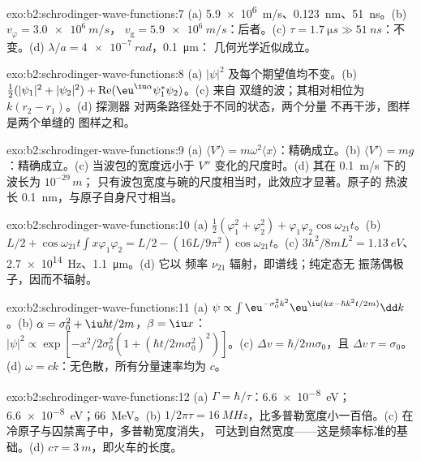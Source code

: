 \begin{solution}{exo:b2:schrodinger-wave-functions:7}
(a) \qty{5.9e6}{m/s}、\qty{0.123}{nm}、\qty{51}{ns}。(b) $v_\varphi = \qty{3.0e6}{m/s}$，
$v_{\text{g}} = \qty{5.9e6}{m/s}$：后者。(c) $\tau = \qty{1.7}{\micro s} \gg
\qty{51}{ns}$：不变。(d) $\lambda/a = \qty{4e-7}{rad}$，\qty{0.1}{\micro m}：
几何光学近似成立。
\end{solution}

\begin{solution}{exo:b2:schrodinger-wave-functions:8}
(a) $|\psi|^2$ 及每个期望值均不变。(b) $\tfrac12(|\psi_1|^2
+ |\psi_2|^2) + \operatorname{Re}(\eu^{\iu\alpha}\psi_1^*\psi_2)$。(c) 来自
双缝的波；其相对相位为 $k(r_2 - r_1)$。(d) 探测器
对两条路径处于不同的状态，两个分量
不再干涉，图样是两个单缝的
图样之和。
\end{solution}

\begin{solution}{exo:b2:schrodinger-wave-functions:9}
(a) $\langle V'\rangle = m\omega^2\langle x\rangle$：精确成立。(b) $\langle V'\rangle
= mg$：精确成立。(c) 当波包的宽度远小于
$V''$ 变化的尺度时。(d) 其在 \qty{0.1}{m/s} 下的波长为 $10^{-29}\,\unit{m}$；
只有波包宽度与碗的尺度相当时，此效应才显著。原子的
热波长 \qty{0.1}{nm}，与原子自身尺寸相当。
\end{solution}

\begin{solution}{exo:b2:schrodinger-wave-functions:10}
(a) $\tfrac12(\varphi_1^2 + \varphi_2^2) + \varphi_1\varphi_2\cos\omega_{21}t$。(b) $L/2 +
\cos\omega_{21}t\int x\varphi_1\varphi_2 = L/2 - (16L/9\pi^2)\cos\omega_{21}t$。(c)
$3h^2/8mL^2 = \qty{1.13}{eV}$、\qty{2.7e14}{Hz}、\qty{1.1}{\micro m}。(d) 它以
频率 $\nu_{21}$ 辐射，即谱线；纯定态无
振荡偶极子，因而不辐射。
\end{solution}

\begin{solution}{exo:b2:schrodinger-wave-functions:11}
(a) $\psi \propto \int\eu^{-\sigma_0^2k^2}\eu^{\iu(kx - \hbar k^2t/2m)}\dd k$。(b) $\alpha =
\sigma_0^2 + \iu\hbar t/2m$，$\beta = \iu x$：$|\psi|^2 \propto \exp[-x^2/2\sigma_0^2(1 +
(\hbar t/2m\sigma_0^2)^2)]$。(c) $\Delta v = \hbar/2m\sigma_0$，且 $\Delta v\,\tau =
\sigma_0$。(d) $\omega = ck$：无色散，所有分量速率均为 $c$。
\end{solution}

\begin{solution}{exo:b2:schrodinger-wave-functions:12}
(a) $\Gamma = \hbar/\tau$：\qty{6.6e-8}{eV}；\qty{6.6e-8}{eV}；\qty{66}{MeV}。(b)
$1/2\pi\tau = \qty{16}{MHz}$，比多普勒宽度小一百倍。(c) 在
冷原子与囚禁离子中，多普勒宽度消失，
可达到自然宽度——这是频率标准的基础。(d) $c\tau =
\qty{3}{m}$，即火车的长度。
\end{solution}

